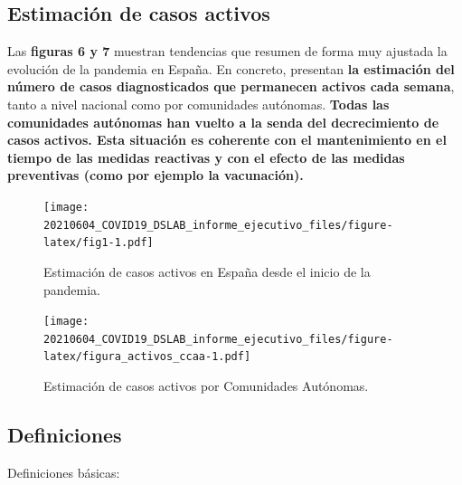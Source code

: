\documentclass[
  11pt,
]{article}
\begin{document}
\clearpage

\setcounter{page}{9}

\hypertarget{estimaciuxf3n-de-casos-activos}{%
\subsection{Estimación de casos
activos}\label{estimaciuxf3n-de-casos-activos}}

Las \textbf{figuras 6 y 7} muestran tendencias que resumen de forma muy
ajustada la evolución de la pandemia en España. En concreto, presentan
\textbf{la estimación del número de casos diagnosticados que permanecen
activos cada semana}, tanto a nivel nacional como por comunidades
autónomas. \textbf{Todas las comunidades autónomas han vuelto a la senda
del decrecimiento de casos activos. Esta situación es coherente con el
mantenimiento en el tiempo de las medidas reactivas y con el efecto de
las medidas preventivas (como por ejemplo la vacunación).}

\vspace{0.2cm}

\begin{figure}
\centering
\texttt{[image: 20210604\_COVID19\_DSLAB\_informe\_ejecutivo\_files/figure-latex/fig1-1.pdf]}
\caption{\label{fig:fig17a_res} Estimación de casos activos en España
desde el inicio de la pandemia.}
\end{figure}

\begin{figure}
\centering
\texttt{[image: 20210604\_COVID19\_DSLAB\_informe\_ejecutivo\_files/figure-latex/figura\_activos\_ccaa-1.pdf]}
\caption{\label{fig:figura_activos_ccaa} Estimación de casos activos por
Comunidades Autónomas.}
\end{figure}

\newpage
\setcounter{page}{11}

\hypertarget{definiciones}{%
\subsection{Definiciones}\label{definiciones}}

Definiciones básicas:
\end{document}
